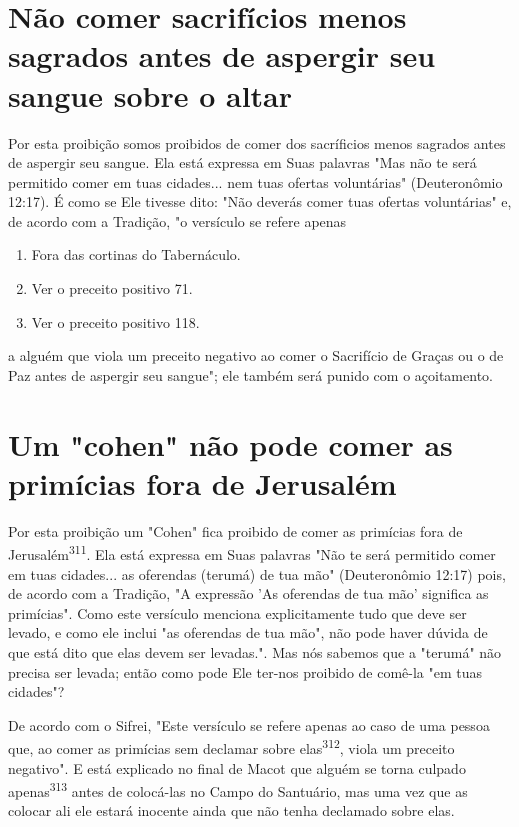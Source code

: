 \begin{itemize}
\begin{enumrate}
\begin{itemize}
\begin{itemize}
\begin{itemize}
\section{Não comer sacrifícios menos sagrados antes de aspergir seu sangue sobre o altar}

Por esta proibição somos proibidos de comer dos sacríficios menos
sagrados antes de aspergir seu sangue. Ela está expressa em Suas
palavras "Mas não te será permitido comer em tuas cidades... nem tuas
ofertas voluntárias" (Deuteronômio 12:17). É como se Ele tivesse dito:
"Não deverás comer tuas ofertas voluntárias" e, de acordo com a
Tradição, "o versículo se refere apenas


\begin{enumerate}
\def\labelenumi{\arabic{enumi}.}
\setcounter{enumi}{306}
\item
 
 Fora das cortinas do Tabernáculo.
 
\item
 
 Ver o preceito positivo 71.
 
\item
 
 Ver o preceito positivo 118.
 
\end{enumerate}

a alguém que viola um preceito negativo ao comer o Sacrifício de Graças
ou o de Paz antes de aspergir seu sangue"; ele também será punido com o
açoitamento.

\section{Um "cohen" não pode comer as primícias fora de Jerusalém}

Por esta proibição um "Cohen" fica proibido de comer as primícias fora
de Jerusalém\textsuperscript{311}. Ela está expressa em Suas palavras
"Não te será permiti­do comer em tuas cidades... as oferendas (terumá)
de tua mão" (Deuteronômio 12:17) pois, de acordo com a Tradição, "A
expressão 'As oferendas de tua mão' significa as primícias". Como este
versículo menciona explicitamente tudo que deve ser levado, e como ele
inclui "as oferendas de tua mão", não pode haver dúvida de que está dito
que elas devem ser levadas.". Mas nós sabemos que a
"terumá" não precisa ser levada; então como pode Ele ter-nos proibido de
comê-la "em tuas cidades"?

De acordo com o Sifrei, "Este versículo se refere apenas ao caso de uma
pessoa que, ao comer as primícias sem declamar sobre
elas\textsuperscript{312}, viola um preceito negativo". E está explicado
no final de Macot que alguém se torna cul­pado
apenas\textsuperscript{313} antes de colocá-las no Campo do Santuário,
mas uma vez que as colocar ali ele estará inocente ainda que não tenha
declamado sobre elas.


\end{itemize}
\end{itemize}
\end{itemize}
\end{enumrate}
\end{itemize}
